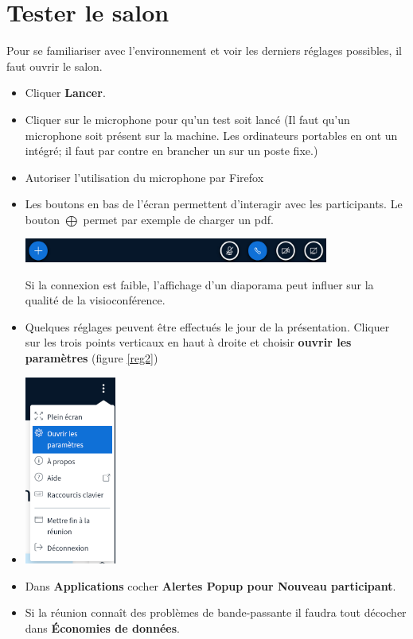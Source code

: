 \documentclass[a4paper,11pt]{article}
\begin{document}
\section{Tester le salon}
Pour se familiariser avec l'environnement et voir les derniers réglages possibles, il faut ouvrir le salon.
\begin{itemize}
    \item Cliquer \textbf{Lancer}.
    \item Cliquer sur le microphone pour qu'un test soit lancé (Il faut qu'un microphone soit présent sur la machine. Les ordinateurs portables en ont un intégré; il faut par contre en brancher un sur un poste fixe.)
    \item Autoriser l'utilisation du microphone par Firefox
    \item Les boutons en bas de l'écran permettent d'interagir avec les participants. Le bouton $\bigoplus$ permet par exemple de charger un pdf.
          \begin{center}
              \centering
              \includegraphics[width=10cm]{ressources/boutons.png}
              \label{interagir}
          \end{center}
    Si la connexion est faible, l'affichage d'un diaporama peut influer sur la qualité de la visioconférence.
    
    \item Quelques réglages peuvent être effectués le jour de la présentation. Cliquer sur les trois points verticaux en haut à droite et choisir \textbf{ouvrir les paramètres} (figure \ref{reg2})
    \item \begin{center}
        \centering
        \includegraphics[width=3cm]{ressources/reglages2.png}
        \label{reg2}
    \end{center}
    
    \item Dans \textbf{Applications} cocher \textbf{Alertes Popup pour Nouveau participant}.
    \item Si la réunion connaît des problèmes de bande-passante il faudra tout décocher dans \textbf{Économies de données}.
\end{itemize}
\end{document}
